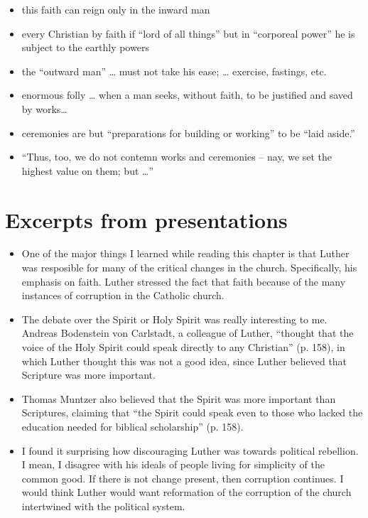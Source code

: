 \begin{frame}[label=sec-2-5]{}
\begin{itemize}
\item this faith can reign only in the inward man
\item every Christian by faith if ``lord of all things'' but in ``corporeal power'' he is subject to the earthly powers
\item the ``outward man'' \ldots{} must not take his ease; \ldots{} exercise, fastings, etc.
\item enormous folly \ldots{} when a man seeks, without faith, to be justified and saved by works\ldots{}
\item ceremonies are but ``preparations for building or working'' to be ``laid aside.''
\item ``Thus, too, we do not contemn works and ceremonies -- nay, we set the highest value on them; but \ldots{}''
\end{itemize}
\end{frame}
\section{Excerpts from presentations}
\label{sec-3}
\begin{frame}[label=sec-3-1]{}
\begin{itemize}
\item One of the major things I learned while reading this chapter is that Luther was resposible for many of the critical changes in the church. Specifically, his emphasis on faith. Luther stressed the fact that faith because of the many instances of corruption in the Catholic church.

\item The debate over the Spirit or Holy Spirit was really interesting to me. Andreas Bodenstein von Carlstadt, a colleague of Luther, ``thought that the voice of the Holy Spirit could speak directly to any Christian'' (p. 158), in which Luther thought this was not a good idea, since Luther believed that Scripture was more important.
\end{itemize}
\end{frame}

\begin{frame}[label=sec-3-2]{}
\begin{itemize}
\item Thomas Muntzer also believed that the Spirit was more important than Scriptures, claiming that ``the Spirit could speak even to those who lacked the education needed for biblical scholarship'' (p. 158).

\item I found it surprising how discouraging Luther was towards political rebellion. I mean, I disagree with his ideals of people living for simplicity of the common good. If there is not change present, then corruption continues. I would think Luther would want reformation of the corruption of the church intertwined with the political system.
\end{itemize}
\end{frame}

